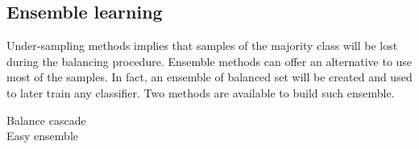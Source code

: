 \documentclass[twoside,11pt]{article}
\begin{document}
\subsection{Ensemble learning}

Under-sampling methods implies that samples of the majority class will be lost during the balancing procedure.
Ensemble methods can offer an alternative to use most of the samples.
In fact, an ensemble of balanced set will be created and used to later train any classifier.
Two methods are available to build such ensemble.

\begin{description}
  \item[Balance cascade]
  \item[Easy ensemble]
\end{description}
\end{document}
